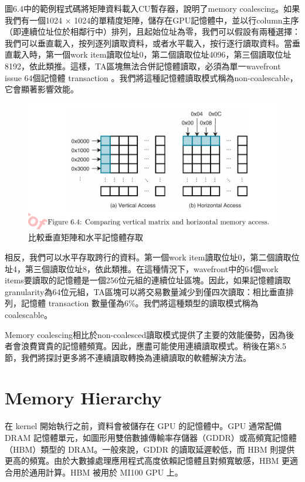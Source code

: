 圖6.4中的範例程式碼將矩陣資料載入CU暫存器，說明了memory coalescing。如果我們有一個1024 × 1024的單精度矩陣，儲存在GPU記憶體中，並以行column主序（即連續位址位於相鄰行中）排列，且起始位址為零，我們可以假設有兩種選擇：我們可以垂直載入，按列逐列讀取資料，或者水平載入，按行逐行讀取資料。當垂直載入時，第一個work item讀取位址0，第二個讀取位址4096，第三個讀取位址8192，依此類推。這樣，TA區塊無法合併記憶體讀取，必須為單一wavefront issue 64個記憶體 transaction 。我們將這種記憶體讀取模式稱為non-coalescable，它會顯著影響效能。

\begin{figure}
    \centering
    \includegraphics[width=1\linewidth]{FileAusiliari//Screenshots/Figure6-4.png}
    \caption{比較垂直矩陣和水平記憶體存取}
    \label{fig:enter-label}
\end{figure}

相反，我們可以水平存取跨行的資料。第一個work item讀取位址0，第二個讀取位址4，第三個讀取位址8，依此類推。在這種情況下，wavefront中的64個work items要讀取的記憶體是一個256位元組的連續位址區塊。因此，如果記憶體讀取granularity為64位元組，TA區塊可以將交易數量減少到僅四次讀取：相比垂直排列，記憶體 transaction 數量僅為6\%。我們將這種類型的讀取模式稱為coalescable。

Memory coalescing相比於non-coalesced讀取模式提供了主要的效能優勢，因為後者會浪費寶貴的記憶體頻寬。因此，應盡可能使用連續讀取模式。稍後在第8.5節，我們將探討更多將不連續讀取轉換為連續讀取的軟體解決方法。

\section{Memory Hierarchy}
在 kernel 開始執行之前，資料會被儲存在 GPU 的記憶體中。GPU 通常配備 DRAM 記憶體單元，如圖形用雙倍數據傳輸率存儲器（GDDR）或高頻寬記憶體（HBM）類型的 DRAM。一般來說，GDDR 的讀取延遲較低，而 HBM 則提供更高的頻寬。由於大數據處理應用程式高度依賴記憶體且對頻寬敏感，HBM 更適合用於通用計算。HBM 被用於 MI100 GPU 上。


